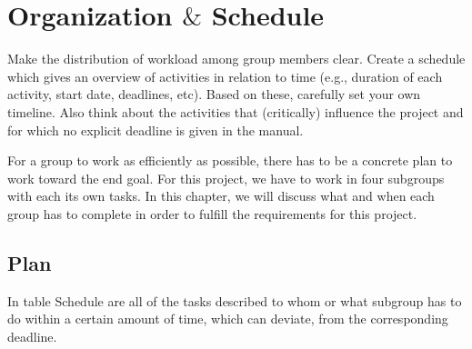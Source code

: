 \chapter{Organization $\&$ Schedule  } Make the distribution of workload among group members clear. Create a schedule which gives an overview of activities in relation to time (e.g., duration of each activity, start date, deadlines, etc). Based on these, carefully set your own timeline. Also think about the activities that (critically) influence the project and for which no explicit deadline is given in the manual.

For a group to work as efficiently as possible, there has to be a concrete plan to work toward the end goal. For this project, we have to work in four subgroups with each its own tasks. In this chapter, we will discuss what and when each group has to complete in order to fulfill the requirements for this project.\\

\section{Plan}
In table Schedule are all of the tasks described to whom or what subgroup has to do within a certain amount of time, which can deviate, from the corresponding deadline.

